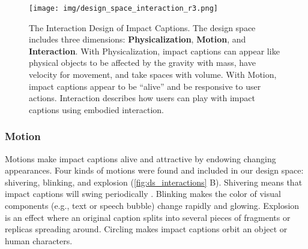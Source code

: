 






\begin{figure*}[ht]
    \centering
    \texttt{[image: img/design\_space\_interaction\_r3.png]}
    \caption{
        The Interaction Design of Impact Captions.
        The design space includes three dimensions: \textbf{Physicalization}, \textbf{Motion}, and \textbf{Interaction}.
        With Physicalization, impact captions can appear like physical objects to be affected by the gravity with mass, have velocity for movement, and take spaces with volume.
        With Motion, impact captions appear to be ``alive'' and be responsive to user actions.
        Interaction describes how users can play with impact captions using embodied interaction.
    }
    \label{fig:ds_interactions}
\end{figure*}


\subsubsection{Motion}
Motions make impact captions alive and attractive by endowing changing appearances. 
Four kinds of motions were found and included in our design space: shivering, blinking, and explosion (\autoref{fig:ds_interactions} B).
Shivering means that impact captions will swing periodically . 
Blinking makes the color of visual components (e.g., text or speech bubble) change rapidly and glowing.
Explosion is an effect where an original caption splits into several pieces of fragments or replicas spreading around.
Circling makes impact captions orbit an object or human characters.

